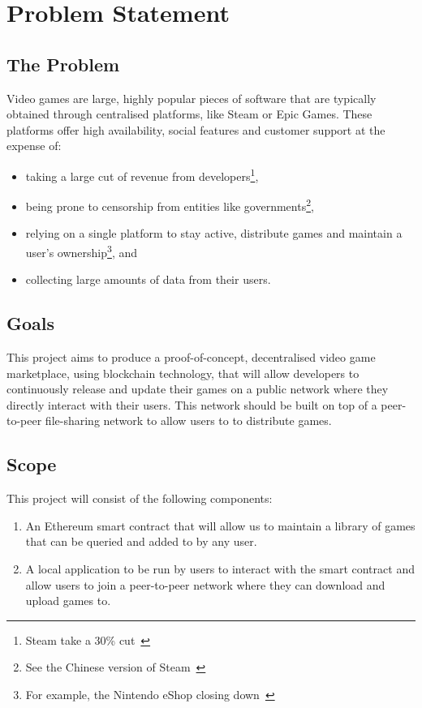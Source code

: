 
\chapter{Problem Statement}

\section{The Problem}\label{sec:problem}

Video games are large, highly popular pieces of software that are typically obtained through centralised platforms, like Steam or Epic Games. These platforms offer high availability, social features and customer support at the expense of:

\begin{itemize}
  \item taking a large cut of revenue from developers\footnote{Steam take a 30\% cut~\cite{marks_report_2019,brown_valve_2021}},
  \item being prone to censorship from entities like governments\footnote{See the Chinese version of Steam~\cite{noauthor_steam_nodate-1}},
  \item relying on a single platform to stay active, distribute games and maintain a user's ownership\footnote{For example, the Nintendo eShop closing down~\cite{noauthor_nintendo_2022}}, and
  \item collecting large amounts of data from their users.
\end{itemize}

\section{Goals}

This project aims to produce a proof-of-concept, decentralised video game marketplace, using blockchain technology, that will allow developers to continuously release and update their games on a public network where they directly interact with their users. This network should be built on top of a peer-to-peer file-sharing network to allow users to to distribute games.

\section{Scope}

This project will consist of the following components:

\begin{enumerate}
  \item An Ethereum smart contract that will allow us to maintain a library of games that can be queried and added to by any user.
  \item A local application to be run by users to interact with the smart contract and allow users to join a peer-to-peer network where they can download and upload games to.
\end{enumerate}